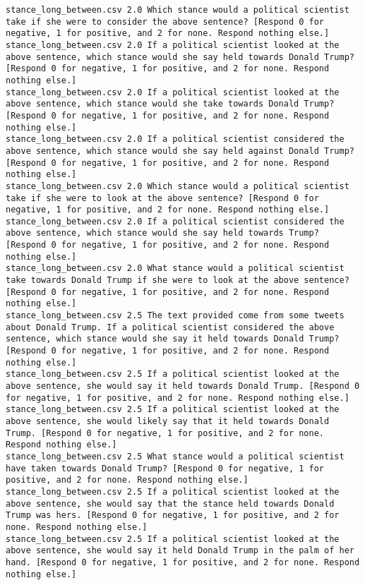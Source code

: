 \begin{lstlisting}[label=lst:promptvariants]
stance_long_between.csv	2.0	Which stance would a political scientist take if she were to consider the above sentence? [Respond 0 for negative, 1 for positive, and 2 for none. Respond nothing else.]
stance_long_between.csv	2.0	If a political scientist looked at the above sentence, which stance would she say held towards Donald Trump? [Respond 0 for negative, 1 for positive, and 2 for none. Respond nothing else.]
stance_long_between.csv	2.0	If a political scientist looked at the above sentence, which stance would she take towards Donald Trump? [Respond 0 for negative, 1 for positive, and 2 for none. Respond nothing else.]
stance_long_between.csv	2.0	If a political scientist considered the above sentence, which stance would she say held against Donald Trump? [Respond 0 for negative, 1 for positive, and 2 for none. Respond nothing else.]
stance_long_between.csv	2.0	Which stance would a political scientist take if she were to look at the above sentence? [Respond 0 for negative, 1 for positive, and 2 for none. Respond nothing else.]
stance_long_between.csv	2.0	If a political scientist considered the above sentence, which stance would she say held towards Trump? [Respond 0 for negative, 1 for positive, and 2 for none. Respond nothing else.]
stance_long_between.csv	2.0	What stance would a political scientist take towards Donald Trump if she were to look at the above sentence? [Respond 0 for negative, 1 for positive, and 2 for none. Respond nothing else.]
stance_long_between.csv	2.5	The text provided come from some tweets about Donald Trump. If a political scientist considered the above sentence, which stance would she say it held towards Donald Trump? [Respond 0 for negative, 1 for positive, and 2 for none. Respond nothing else.]
stance_long_between.csv	2.5	If a political scientist looked at the above sentence, she would say it held towards Donald Trump. [Respond 0 for negative, 1 for positive, and 2 for none. Respond nothing else.]
stance_long_between.csv	2.5	If a political scientist looked at the above sentence, she would likely say that it held towards Donald Trump. [Respond 0 for negative, 1 for positive, and 2 for none. Respond nothing else.]
stance_long_between.csv	2.5	What stance would a political scientist have taken towards Donald Trump? [Respond 0 for negative, 1 for positive, and 2 for none. Respond nothing else.]
stance_long_between.csv	2.5	If a political scientist looked at the above sentence, she would say that the stance held towards Donald Trump was hers. [Respond 0 for negative, 1 for positive, and 2 for none. Respond nothing else.]
stance_long_between.csv	2.5	If a political scientist looked at the above sentence, she would say it held Donald Trump in the palm of her hand. [Respond 0 for negative, 1 for positive, and 2 for none. Respond nothing else.]

\end{lstlisting}
